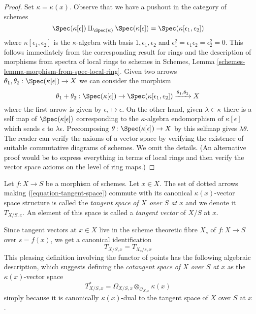 \begin{proof}
Set $\kappa = \kappa(x)$. Observe that we have a pushout in the
category of schemes
$$
\Spec(\kappa[\epsilon]) \amalg_{\Spec(\kappa)} \Spec(\kappa[\epsilon])
= \Spec(\kappa[\epsilon_1, \epsilon_2])
$$
where $\kappa[\epsilon_1, \epsilon_2]$ is the $\kappa$-algebra with
basis $1, \epsilon_1, \epsilon_2$ and
$\epsilon_1^2 = \epsilon_1\epsilon_2 = \epsilon_2^2 = 0$.
This follows immediately from the corresponding result for
rings and the description of morphisms from spectra of local rings
to schemes in
Schemes, Lemma \ref{schemes-lemma-morphism-from-spec-local-ring}.
Given two arrows
$\theta_1, \theta_2 : \Spec(\kappa[\epsilon]) \to X$
we can consider the morphism
$$
\theta_1 + \theta_2 :
\Spec(\kappa[\epsilon]) \to
\Spec(\kappa[\epsilon_1, \epsilon_2])
\xrightarrow{\theta_1, \theta_2} X
$$
where the first arrow is given by $\epsilon_i \mapsto \epsilon$.
On the other hand, given $\lambda \in \kappa$ there is a self map
of $\Spec(\kappa[\epsilon])$ corresponding to the $\kappa$-algebra
endomorphism of $\kappa[\epsilon]$ which sends $\epsilon$ to $\lambda \epsilon$.
Precomposing $\theta : \Spec(\kappa[\epsilon]) \to X$
by this selfmap gives $\lambda \theta$. The reader can verify
the axioms of a vector space by verifying the existence
of suitable commutative diagrams of schemes. We omit the details.
(An alternative proof would be to express everything in terms of local
rings and then verify the vector space axioms on the level of ring maps.)
\end{proof}

\begin{definition}
\label{definition-tangent-space}
Let $f : X \to S$ be a morphism of schemes. Let $x \in X$. The set of
dotted arrows making (\ref{equation-tangent-space}) commute with
its canonical $\kappa(x)$-vector space structure is called
the {\it tangent space of $X$ over $S$ at $x$} and we denote it $T_{X/S, x}$.
An element of this space is called a {\it tangent vector} of $X/S$ at $x$.
\end{definition}

\noindent
Since tangent vectors at $x \in X$ live in the scheme theoretic fibre
$X_s$ of $f : X \to S$ over $s = f(x)$, we get a canonical identification
\begin{equation}
\label{equation-tangent-space-fibre}
T_{X/S, x} = T_{X_s/s, x}
\end{equation}
This pleasing definition involving the functor of points has the following
algebraic description, which suggests defining the
{\it cotangent space of $X$ over $S$ at $x$} as the $\kappa(x)$-vector
space
$$
T^*_{X/S, x} = \Omega_{X/S, x} \otimes_{\mathcal{O}_{X, x}} \kappa(x)
$$
simply because it is canonically $\kappa(x)$-dual to the tangent space of
$X$ over $S$ at $x$.

